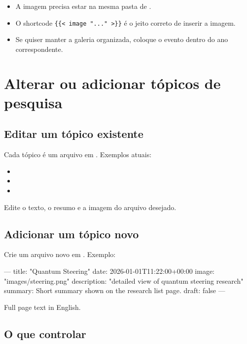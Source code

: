 \documentclass[11pt,a4paper]{article}
\begin{document}
\begin{itemize}
  \item A imagem precisa estar na mesma pasta de .
  \item O shortcode \texttt{\{\{< image "..."\ >\}\}} é o jeito correto de inserir a imagem.
  \item Se quiser manter a galeria organizada, coloque o evento dentro do ano correspondente.
\end{itemize}

\section{Alterar ou adicionar tópicos de pesquisa}

\subsection{Editar um tópico existente}

Cada tópico é um arquivo em . Exemplos atuais:

\begin{itemize}
  \item {}
  \item {}
  \item {}
\end{itemize}

Edite o texto, o resumo e a imagem do arquivo desejado.

\subsection{Adicionar um tópico novo}

Crie um arquivo novo em . Exemplo:

\begin{terminal}
---
title: "Quantum Steering"
date: 2026-01-01T11:22:00+00:00
image: "images/steering.png"
description: "detailed view of quantum steering research"
summary: Short summary shown on the research list page.
draft: false
---

Full page text in English.
\end{terminal}

\subsection{O que controlar}
\end{document}

